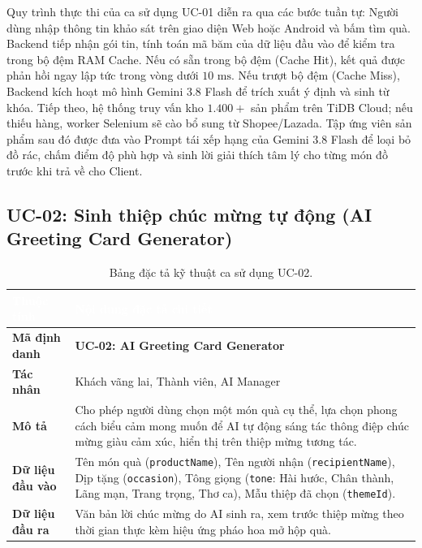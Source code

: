 Quy trình thực thi của ca sử dụng UC-01 diễn ra qua các bước tuần tự: Người dùng nhập thông tin khảo sát trên giao diện Web hoặc Android và bấm tìm quà. Backend tiếp nhận gói tin, tính toán mã băm của dữ liệu đầu vào để kiểm tra trong bộ đệm RAM Cache. Nếu có sẵn trong bộ đệm (Cache Hit), kết quả được phản hồi ngay lập tức trong vòng dưới $10\text{ ms}$. Nếu trượt bộ đệm (Cache Miss), Backend kích hoạt mô hình Gemini 3.8 Flash để trích xuất ý định và sinh từ khóa. Tiếp theo, hệ thống truy vấn kho $1.400+$ sản phẩm trên TiDB Cloud; nếu thiếu hàng, worker Selenium sẽ cào bổ sung từ Shopee/Lazada. Tập ứng viên sản phẩm sau đó được đưa vào Prompt tái xếp hạng của Gemini 3.8 Flash để loại bỏ đồ rác, chấm điểm độ phù hợp và sinh lời giải thích tâm lý cho từng món đồ trước khi trả về cho Client.

\subsection{UC-02: Sinh thiệp chúc mừng tự động (AI Greeting Card Generator)}

\begin{table}[htbp]
\centering
\caption{Bảng đặc tả kỹ thuật ca sử dụng UC-02.}
\label{tab:spec_uc02}
\small
\renewcommand{\arraystretch}{1.2}
\begin{tabularx}{\textwidth}{|p{3.2cm}|X|}
\hline
\rowcolor{PrimaryBlue}
\textcolor{white}{\textbf{Thuộc tính}} & \textcolor{white}{\textbf{Nội dung đặc tả chi tiết}} \\
\hline
\textbf{Mã định danh} & \textbf{UC-02: AI Greeting Card Generator} \\
\hline
\textbf{Tác nhân} & Khách vãng lai, Thành viên, AI Manager \\
\hline
\textbf{Mô tả} & Cho phép người dùng chọn một món quà cụ thể, lựa chọn phong cách biểu cảm mong muốn để AI tự động sáng tác thông điệp chúc mừng giàu cảm xúc, hiển thị trên thiệp mừng tương tác. \\
\hline
\textbf{Dữ liệu đầu vào} & Tên món quà (\texttt{productName}), Tên người nhận (\texttt{recipientName}), Dịp tặng (\texttt{occasion}), Tông giọng (\texttt{tone}: Hài hước, Chân thành, Lãng mạn, Trang trọng, Thơ ca), Mẫu thiệp đã chọn (\texttt{themeId}). \\
\hline
\textbf{Dữ liệu đầu ra} & Văn bản lời chúc mừng do AI sinh ra, xem trước thiệp mừng theo thời gian thực kèm hiệu ứng pháo hoa mở hộp quà. \\
\hline
\end{tabularx}
\end{table}

